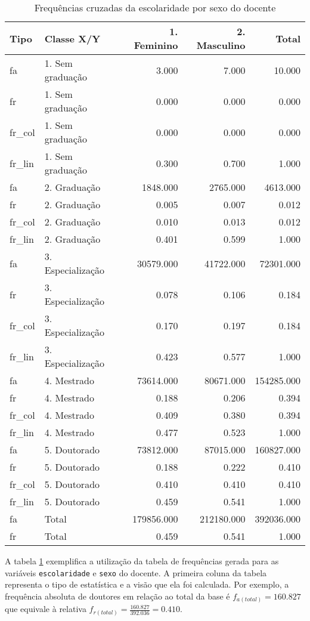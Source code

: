 \documentclass[12pt,]{style/krantz}
\theoremstyle{definition}
\theoremstyle{definition}
\theoremstyle{definition}
\theoremstyle{remark}
\begin{document}
\begin{table}[!h]

\caption{\label{tab:tab05}Frequências cruzadas da escolaridade por sexo do docente}
\centering
\begin{tabular}{llrrr}
\toprule
Tipo & Classe X/Y & 1. Feminino & 2. Masculino & Total\\
\midrule
fa & 1. Sem graduação & 3.000 & 7.000 & 10.000\\
fr & 1. Sem graduação & 0.000 & 0.000 & 0.000\\
fr\_col & 1. Sem graduação & 0.000 & 0.000 & 0.000\\
fr\_lin & 1. Sem graduação & 0.300 & 0.700 & 1.000\\
fa & 2. Graduação & 1848.000 & 2765.000 & 4613.000\\
\addlinespace
fr & 2. Graduação & 0.005 & 0.007 & 0.012\\
fr\_col & 2. Graduação & 0.010 & 0.013 & 0.012\\
fr\_lin & 2. Graduação & 0.401 & 0.599 & 1.000\\
fa & 3. Especialização & 30579.000 & 41722.000 & 72301.000\\
fr & 3. Especialização & 0.078 & 0.106 & 0.184\\
\addlinespace
fr\_col & 3. Especialização & 0.170 & 0.197 & 0.184\\
fr\_lin & 3. Especialização & 0.423 & 0.577 & 1.000\\
fa & 4. Mestrado & 73614.000 & 80671.000 & 154285.000\\
fr & 4. Mestrado & 0.188 & 0.206 & 0.394\\
fr\_col & 4. Mestrado & 0.409 & 0.380 & 0.394\\
\addlinespace
fr\_lin & 4. Mestrado & 0.477 & 0.523 & 1.000\\
fa & 5. Doutorado & 73812.000 & 87015.000 & 160827.000\\
fr & 5. Doutorado & 0.188 & 0.222 & 0.410\\
fr\_col & 5. Doutorado & 0.410 & 0.410 & 0.410\\
fr\_lin & 5. Doutorado & 0.459 & 0.541 & 1.000\\
\addlinespace
fa & Total & 179856.000 & 212180.000 & 392036.000\\
fr & Total & 0.459 & 0.541 & 1.000\\
\bottomrule
\end{tabular}
\end{table}

A tabela \ref{tab:tab05} exemplifica a utilização da tabela de frequências gerada para as variáveis \texttt{escolaridade} e \texttt{sexo} do docente. A primeira coluna da tabela representa o tipo de estatística e a visão que ela foi calculada. Por exemplo, a frequência absoluta de doutores em relação ao total da base é \(f_{a(total)} = 160.827\) que equivale à relativa \(f_{r(total)} = \frac{160.827}{392.036} = 0.410\).
\end{document}

